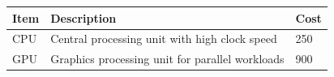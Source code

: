 \begin{table}[htbp]
\centering
\begin{tabular}{lp{5cm}p{3cm}}
\toprule
Item & Description & Cost \\
\midrule
CPU & Central processing unit with high clock speed & 250 \\
GPU & Graphics processing unit for parallel workloads & 900 \\
\bottomrule
\end{tabular}
\end{table}
